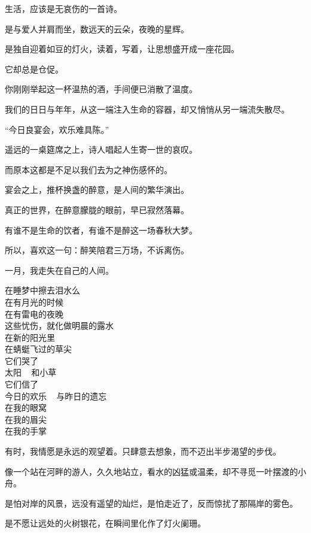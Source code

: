 		生活，应该是无哀伤的一首诗。\par
		是与爱人并肩而坐，数远天的云朵，夜晚的星辉。\par
		是独自迎着如豆的灯火，读着，写着，让思想盛开成一座花园。\par
		它却总是仓促。\par
		你刚刚举起这一杯温热的酒，手间便已消散了温度。\par
		我们的日日与年年，从这一端注入生命的容器，却又悄悄从另一端流失散尽。

		“今日良宴会，欢乐难具陈。”

		遥远的一桌筵席之上，诗人唱起人生寄一世的哀叹。\par
		而原本这都是不足以我们去为之神伤感怀的。\par
		宴会之上，推杯换盏的醉意，是人间的繁华演出。\par
		真正的世界，在醉意朦胧的眼前，早已寂然落幕。

		有谁不是生命的饮者，有谁不是醉这一场春秋大梦。\par
		所以，喜欢这一句：醉笑陪君三万场，不诉离伤。

		一月，我走失在自己的人间。

	\endwriting

	\longpoem{}{}{}

		在睡梦中擦去泪水么 \\
		在有月光的时候 \\
		在有雷电的夜晚 \\
		这些忧伤，就化做明晨的露水 \\
		在新的阳光里 \\
		在蜻蜓飞过的草尖 \\
		它们哭了 \\
		太阳 ~ 和小草 \\
		它们信了 \\
		今日的欢乐 ~ 与昨日的遗忘 \\
		在我的眼窝 \\
		在我的眉尖 \\
		在我的手掌

	\endlongpoem
	\endwriting



		有时，我情愿是永远的观望着。只肆意去想象，而不迈出半步渴望的步伐。\par
		像一个站在河畔的游人，久久地站立，看水的凶猛或温柔，却不寻觅一叶摆渡的小舟。\par
		是怕对岸的风景，远没有遥望的灿烂，是怕走近了，反而惊扰了那隔岸的雾色。\par
		是不愿让远处的火树银花，在瞬间里化作了灯火阑珊。

